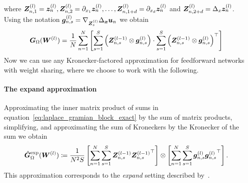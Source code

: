 where ${\bm{Z}}_{n, 1}^{(l)} = {\bm{z}}_n^{(l)}, {\bm{Z}}_{n, 2}^{(l)} = \partial_{x_1}{\bm{z}}_n^{(l)}, \dots, {\bm{Z}}_{n, 1+d}^{(l)} = \partial_{x_d}{\bm{z}}_n^{(l)}$ and ${\bm{Z}}_{n, 2+d}^{(l)} = \Delta_x{\bm{z}}_n^{(l)}$.
Using the notation
${\bm{g}}_{n, s}^{(l)} = \nabla_{{\bm{Z}}_{s}^{(l)}} \Delta_{\bm{x}}{\bm{u}}_n$ we obtain
\begin{equation}\label{eq:laplace_gramian_block_exact}
    {\bm{G}}_\Omega({\bm{W}}^{(l)})
    =
    \frac1N\sum_{n=1}^N
    \left[\sum_{s=1}^S \left( {\bm{Z}}^{(l-1)}_{n,s}\otimes {\bm{g}}_{n,s}^{(l)} \right)
    \cdot
    \sum_{s=1}^S \left( {\bm{Z}}
    ^{(l-1)}_{n,s}\otimes {\bm{g}}_{n,s}^{(l)} \right)^\top\right]
\end{equation}
Now we can use any Kronecker-factored approximation for feedforward networks with weight sharing, where we choose to work with the following.

%


\paragraph{The expand approximation}
Approximating the inner matrix product of sums in equation~\eqref{eq:laplace_gramian_block_exact} by the sum of matrix products, simplifying, and approximating the sum of Kroneckers by the Kronecker of the sum we obtain
\begin{align}
    \hat{{\bm{G}}}_\Omega^{\textup{exp}}({\bm{W}}^{(l)})
    \coloneqq \frac{1}{N^2 S}
    \left[\sum_{n=1}^N \sum_{s=1}^S {\bm{Z}}^{(l-1)}_{n,s}{{\bm{Z}}^{(l-1)}_{n,s}}^\top \right]
    \otimes
    \left[\sum_{n=1}^N\sum_{s=1}^S {\bm{g}}^{(l)}_{n,s}{{\bm{g}}^{(l)}_{n,s}}^\top   \right].
\end{align}
This approximation corresponds to the \emph{expand} setting described by~\citet{eschenhagen2023kroneckerfactored}.


